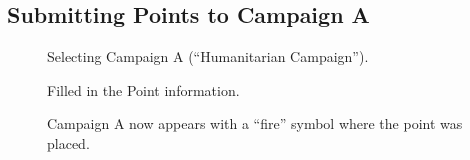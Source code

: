\documentclass{article}
\begin{document}
		\FloatBarrier
		\subsection{Submitting Points to Campaign A}

		\begin{figure}[ht]
			\centering
			\caption{Selecting Campaign A (``Humanitarian Campaign'').}
			\label{fig:eval-submita-1}
		\end{figure}

		\begin{figure}[ht]
			\centering
			\caption{Filled in the Point information.}
			\label{fig:eval-submita-2}
		\end{figure}

		\begin{figure}[ht]
			\centering
			\caption{Campaign A now appears with a ``fire'' symbol where the point was placed.}
			\label{fig:eval-submita-3}
		\end{figure}
\end{document}
